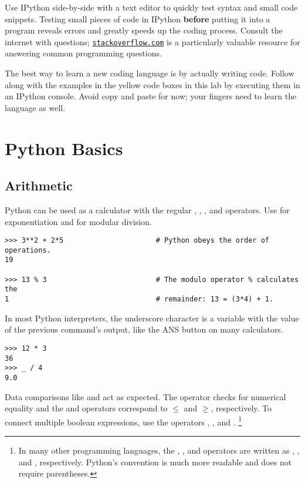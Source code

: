 \begin{info}
Use IPython side-by-side with a text editor to quickly test syntax and small code snippets.
Testing small pieces of code in IPython \textbf{before} putting it into a program reveals errors and greatly speeds up the coding process.
Consult the internet with questions; \href{http://stackoverflow.com/}{\texttt{stackoverflow.com}} is a particularly valuable resource for answering common programming questions.

The best way to learn a new coding language is by actually writing code.
Follow along with the examples in the yellow code boxes in this lab by executing them in an IPython console.
Avoid copy and paste for now; your fingers need to learn the language as well.
\end{info}

\section*{Python Basics} %

\subsection*{Arithmetic} %

Python can be used as a calculator with the regular \li{+}, \li{-}, \li{*}, and \li{/} operators.
Use \li{**} for exponentiation and \li{\%} for modular division.

\begin{lstlisting}
>>> 3**2 + 2*5                      # Python obeys the order of operations.
19

>>> 13 % 3                          # The modulo operator % calculates the
1                                   # remainder: 13 = (3*4) + 1.
\end{lstlisting}

In most Python interpreters, the underscore character \li{\_} is a variable with the value of the previous command's output, like the ANS button on many calculators.

\begin{lstlisting}
>>> 12 * 3
36
>>> _ / 4
9.0
\end{lstlisting}

Data comparisons like \li{<} and \li{>} act as expected.
The \li{==} operator checks for numerical equality and the \li{<=} and \li{>=} operators correspond to $\le$ and $\ge$, respectively.
To connect multiple boolean expressions, use the operators , , and .%
\footnote{In many other programming languages, the , , and  operators are written as \lif{&&}, \lif{||}, and \lif{!}, respectively. Python's convention is much more readable and does not require parentheses.}

